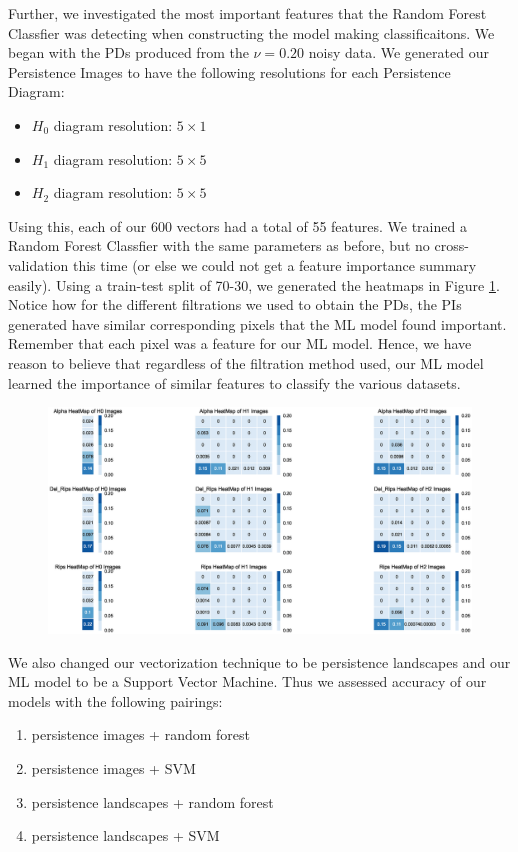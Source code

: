 \documentclass[letterpaper,titlepage]{article}
\begin{document}
    Further, we investigated the most important features that the Random Forest Classfier was detecting when constructing the model making classificaitons. We began with the PDs produced from the $\nu=0.20$ noisy data. We generated our Persistence Images to have the following resolutions for each Persistence Diagram:
    \begin{itemize}
        \item $H_0$ diagram resolution: $5 \times 1$
        \item $H_1$ diagram resolution: $5 \times 5$
        \item $H_2$ diagram resolution: $5 \times 5$
    \end{itemize}
    Using this, each of our 600 vectors had a total of 55 features. We trained a Random Forest Classfier with the same parameters as before, but no cross-validation this time (or else we could not get a feature importance summary easily). Using a train-test split of 70-30, we generated the heatmaps in Figure \ref{fig:heatmaps}. Notice how for the different filtrations we used to obtain the PDs, the PIs generated have similar corresponding pixels that the ML model found important. Remember that each pixel was a feature for our ML model. Hence, we have reason to believe that regardless of the filtration method used, our ML model learned the importance of similar features to classify the various datasets.

    \begin{figure}[ht!]
        \centering
        \includegraphics[width=\columnwidth]{figures/heatmaps_feat_imp.eps}
        \caption{}
        \label{fig:heatmaps}
    \end{figure}

    We also changed our vectorization technique to be persistence landscapes and our ML model to be a Support Vector Machine. Thus we assessed accuracy of our models with the following pairings:
    \begin{enumerate}
        \item persistence images + random forest
        \item persistence images + SVM
        \item persistence landscapes + random forest
        \item persistence landscapes + SVM
    \end{enumerate}
\end{document}
